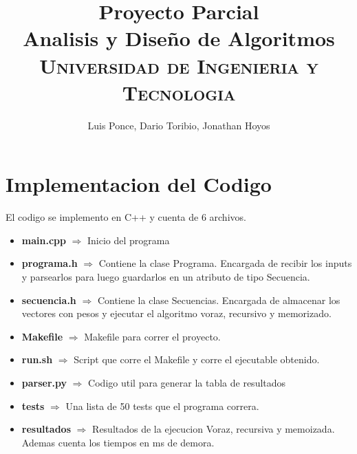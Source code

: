 \documentclass[12pt]{article}
\begin{document}
 


 
\title{Proyecto Parcial\\
Analisis y Diseño de Algoritmos\\
\textsc{Universidad de Ingenieria y Tecnologia}
}
\author{Luis Ponce, Dario Toribio, Jonathan Hoyos}


\maketitle

\doublespacing
\tableofcontents
\singlespacing

\newpage

\section{Implementacion del Codigo}

El codigo se implemento en C++ y cuenta de 6 archivos.

\begin{itemize}
		\item \textbf{main.cpp} $\Rightarrow$ Inicio del programa
		\item \textbf{programa.h} $\Rightarrow$ Contiene la clase Programa. Encargada de recibir los inputs y parsearlos para luego guardarlos en un atributo de tipo Secuencia.
		\item \textbf{secuencia.h} $\Rightarrow$ Contiene la clase Secuencias. Encargada de almacenar los vectores con pesos y ejecutar el algoritmo voraz, recursivo y memorizado.
		\item \textbf{Makefile} $\Rightarrow$ Makefile para correr el proyecto.
		\item \textbf{run.sh} $\Rightarrow$ Script que corre el Makefile y corre el ejecutable obtenido.
		\item \textbf{parser.py} $\Rightarrow$ Codigo util para generar la tabla de resultados
		\item \textbf{tests} $\Rightarrow$ Una lista de 50 tests que el programa correra.
		\item \textbf{resultados}  $\Rightarrow$ Resultados de la ejecucion Voraz, recursiva y memoizada. Ademas cuenta los tiempos en ms de demora. 
		
\end{itemize}
\end{document}
